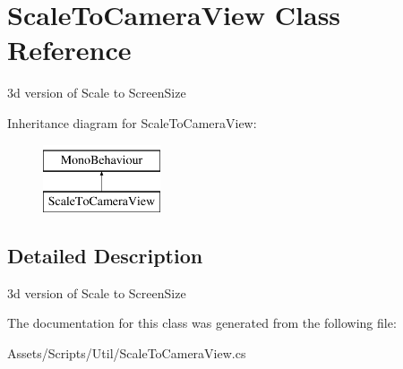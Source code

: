 \hypertarget{class_scale_to_camera_view}{}\section{Scale\+To\+Camera\+View Class Reference}
\label{class_scale_to_camera_view}


3d version of Scale to Screen\+Size  


Inheritance diagram for Scale\+To\+Camera\+View\+:\begin{figure}[H]
\begin{center}
\leavevmode
\includegraphics[height=2.000000cm]{class_scale_to_camera_view}
\end{center}
\end{figure}


\subsection{Detailed Description}
3d version of Scale to Screen\+Size 



The documentation for this class was generated from the following file\+:\begin{DoxyCompactItemize}
\item 
Assets/\+Scripts/\+Util/Scale\+To\+Camera\+View.\+cs\end{DoxyCompactItemize}
